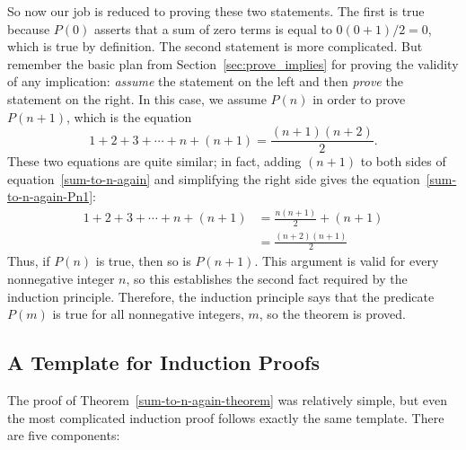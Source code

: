So now our job is reduced to proving these two statements.  The first
is true because $P(0)$ asserts that a sum of zero terms is equal to
$0(0+1)/2 = 0$, which is true by definition.
%
The second statement is more complicated.  But remember the basic plan
from Section~\ref{sec:prove_implies} for proving the validity of any
implication: \emph{assume} the statement on the left and
then \emph{prove} the statement on the right.  In this case, we assume
$P(n)$ in order to prove $P(n+1)$, which is the equation
\begin{equation}\label{sum-to-n-again-Pn1}
1 + 2 + 3 + \cdots + n + (n+1) = \frac{(n+1)(n+2)}{2}.
\end{equation}
These two equations are quite similar; in fact, adding $(n+1)$ to both
sides of equation~\eqref{sum-to-n-again} and simplifying the right side 
gives the equation~\eqref{sum-to-n-again-Pn1}:
\begin{align*}
1 + 2 + 3 + \cdots + n + (n+1)
    & = \frac{n(n+1)}{2} + (n+1) \\
    & = \frac{(n+2)(n+1)}{2}
\end{align*}
Thus, if $P(n)$ is true, then so is $P(n+1)$.  This argument is valid for
every nonnegative integer $n$, so this establishes the second fact
required by the induction principle.  Therefore, the induction principle
says that the predicate $P(m)$ is true for all nonnegative integers, $m$,
so the theorem is proved.

\iffalse
In effect, we've just proved
that $P(0)$ implies $P(1)$, $P(1)$ implies $P(2)$, $P(2)$ implies
$P(3)$, etc., all in one fell swoop.
\fi

\subsection{A Template for Induction Proofs}
\label{templ-induct-proofs}

The proof of Theorem~\ref{sum-to-n-again-theorem} was relatively simple,
but even the most complicated induction proof follows exactly the same
template.  There are five components:

